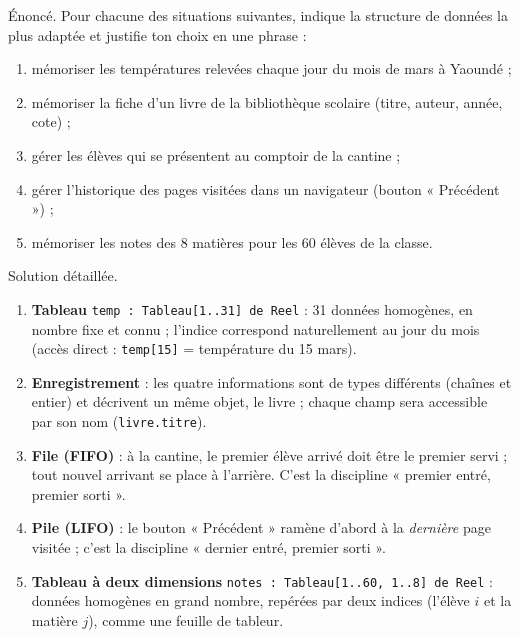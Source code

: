\documentclass[11pt]{article}
\begin{document}
\begin{exoresolu}
Énoncé. Pour chacune des situations suivantes, indique la structure de données la plus adaptée et justifie ton choix en une phrase :
\begin{enumerate}
\item mémoriser les températures relevées chaque jour du mois de mars à Yaoundé ;
\item mémoriser la fiche d'un livre de la bibliothèque scolaire (titre, auteur, année, cote) ;
\item gérer les élèves qui se présentent au comptoir de la cantine ;
\item gérer l'historique des pages visitées dans un navigateur (bouton « Précédent ») ;
\item mémoriser les notes des 8 matières pour les 60 élèves de la classe.
\end{enumerate}
\tcblower
Solution détaillée.
\begin{enumerate}
\item \textbf{Tableau} \texttt{temp : Tableau[1..31] de Reel} : 31 données homogènes, en nombre fixe et connu ; l'indice correspond naturellement au jour du mois (accès direct : \texttt{temp[15]} = température du 15 mars).
\item \textbf{Enregistrement} : les quatre informations sont de types différents (chaînes et entier) et décrivent un même objet, le livre ; chaque champ sera accessible par son nom (\texttt{livre.titre}).
\item \textbf{File (FIFO)} : à la cantine, le premier élève arrivé doit être le premier servi ; tout nouvel arrivant se place à l'arrière. C'est la discipline « premier entré, premier sorti ».
\item \textbf{Pile (LIFO)} : le bouton « Précédent » ramène d'abord à la \emph{dernière} page visitée ; c'est la discipline « dernier entré, premier sorti ».
\item \textbf{Tableau à deux dimensions} \texttt{notes : Tableau[1..60, 1..8] de Reel} : données homogènes en grand nombre, repérées par deux indices (l'élève $i$ et la matière $j$), comme une feuille de tableur.
\end{enumerate}
\end{exoresolu}
\end{document}
